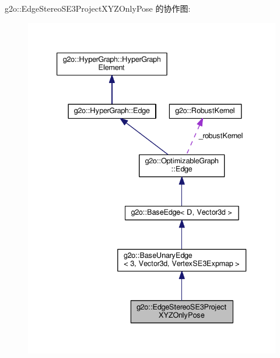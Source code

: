 g2o\-:\-:Edge\-Stereo\-S\-E3\-Project\-X\-Y\-Z\-Only\-Pose 的协作图\-:
\nopagebreak
\begin{figure}[H]
\begin{center}
\leavevmode
\includegraphics[width=336pt]{classg2o_1_1EdgeStereoSE3ProjectXYZOnlyPose__coll__graph}
\end{center}
\end{figure}
